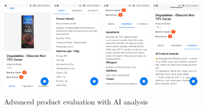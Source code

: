 \begin{figure}[H]
    \centering
    \includegraphics[width=0.22\textwidth]{images/Screenshot_20250920-000112_chocolat_noir.jpg}
    \includegraphics[width=0.22\textwidth]{images/Screenshot_20250920-000118_chocolat_noir.jpg}
    \includegraphics[width=0.22\textwidth]{images/Screenshot_20250920-000124_chocolat_noir.jpg}
    \includegraphics[width=0.22\textwidth]{images/Screenshot_20250920-000137_chocolat_noir.jpg}
    \caption{Advanced product evaluation with AI analysis}
    \label{fig:advanced_AI_evaluation}
\end{figure}

